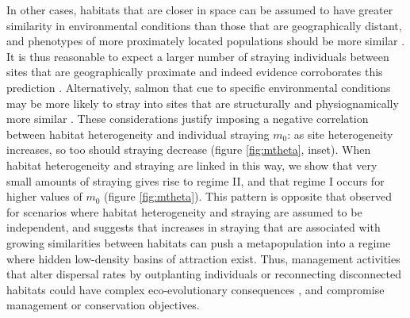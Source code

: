 \documentclass{revtex4}
\begin{document}
In other cases, habitats that are closer in space can be assumed to have greater similarity in environmental conditions than those that are geographically distant, and phenotypes of more proximately located populations should be more similar \citep{Reisenbichler:1988ex,Fraser:2011co,Westley:2012ui}.
It is thus reasonable to expect a larger number of straying individuals between sites that are geographically proximate and indeed evidence corroborates this prediction \citep{Candy:2000hu,JPE:JPE1383}.
Alternatively, salmon that cue to specific environmental conditions may be more likely to stray into sites that are structurally and physiognamically more similar \citep{Peterson:2014gy}.
These considerations justify imposing a negative correlation between habitat heterogeneity and individual straying $m_0$: as site heterogeneity increases, so too should straying decrease (figure \ref{fig:mtheta}, inset).
When habitat heterogeneity and straying are linked in this way, we show that very small amounts of straying gives rise to regime II, and that regime I occurs for higher values of $m_0$ (figure \ref{fig:mtheta}).
This pattern is opposite that observed for scenarios where habitat heterogeneity and straying are assumed to be independent, and suggests that increases in straying that are associated with growing similarities between habitats can push a metapopulation into a regime where hidden low-density basins of attraction exist.
Thus, management activities that alter dispersal rates by outplanting individuals or reconnecting disconnected habitats could have complex eco-evolutionary consequences \citep{Anderson:2013bf,Pess:2014isa}, and compromise management or conservation objectives.


\end{document}

